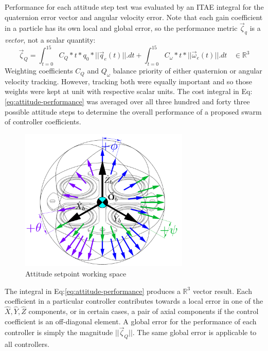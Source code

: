 \par
Performance for each attitude step test was evaluated by an ITAE integral for the quaternion error vector and angular velocity error. Note that each gain coefficient in a particle has its own local and global error, so the performance metric $\vec{\zeta}_{q}$ is a \emph{vector}, not a scalar quantity:
\begin{equation}\label{eq:attitude-performance}
\vec{\zeta}_{Q}=\int_{t=0}^{15}C_Q*t*q_0*||\vec{q}_e(t)||.dt+\int_{t=0}^{15}C_\omega*t*||\vec{\omega}_e(t)||.dt~~~~\in\mathbb{R}^{3}
\end{equation}
Weighting coefficients $C_Q$ and $Q_\omega$ balance priority of either quaternion or angular velocity tracking. However, tracking both were equally important and so those weights were kept at unit with respective scalar units. The cost integral in Eq:\ref{eq:attitude-performance} was averaged over all three hundred and forty three possible attitude steps to determine the overall performance of a proposed swarm of controller coefficients.
\begin{figure}[htbp]
\vspace{-6pt}
\centering
\includegraphics[width=0.72\textwidth]{figs/attitude-setpoint}
\vspace{-6pt}
\caption{Attitude setpoint working space}
\vspace{-14pt}
\label{fig:attitude-setpoint}
\end{figure}
\par
The integral in Eq:\ref{eq:attitude-performance} produces a $\mathbb{R}^{3}$ vector result. Each coefficient in a particular controller contributes towards a local error in one of the $\hat{X},\hat{Y},\hat{Z}$ components, or in certain cases, a pair of axial components if the control coefficient is an off-diagonal element. A global error for the performance of each controller is simply the magnitude $||\vec{\zeta}_Q||$. The same global error is applicable to all controllers. 
